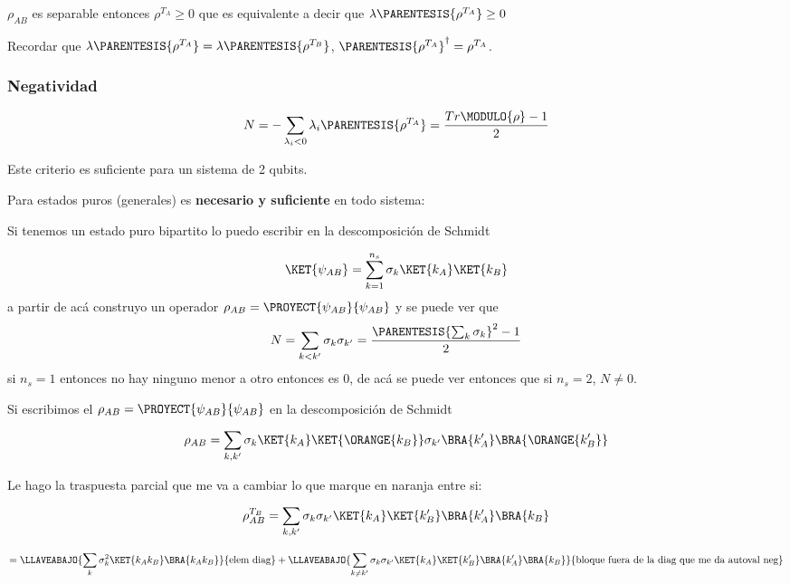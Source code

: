 $\rho_{AB}$ es separable entonces $\rho^{T_{A}}\ge0$ que es equivalente
a decir que $\lambda\PARENTESIS{\rho^{T_{A}}}\ge0$

Recordar que $\lambda\PARENTESIS{\rho^{T_{A}}}=\lambda\PARENTESIS{\rho^{T_{B}}}$,
$\PARENTESIS{\rho^{T_{A}}}^{\dagger}=\rho^{T_{A}}$.

\subsubsection{Negatividad}

\[
N=-\sum_{\lambda_{i}<0}\lambda_{i}\PARENTESIS{\rho^{T_{A}}}=\frac{Tr\MODULO{\rho}-1}{2}
\]

Este criterio es suficiente para un sistema de 2 qubits.

Para estados puros (generales) es \textbf{necesario y suficiente}
en todo sistema:

Si tenemos un estado puro bipartito lo puedo escribir en la descomposición
de Schmidt

\[
\KET{\psi_{AB}}=\sum_{k=1}^{n_{s}}\sigma_{k}\KET{k_{A}}\KET{k_{B}}
\]
 a partir de acá construyo un operador $\rho_{AB}=\PROYECT{\psi_{AB}}{\psi_{AB}}$
y se puede ver que 
\[
N=\sum_{k<k'}\sigma_{k}\sigma_{k'}=\frac{\PARENTESIS{\sum_{k}\sigma_{k}}^{2}-1}{2}
\]
 si $n_{s}=1$ entonces no hay ninguno menor a otro entonces es 0,
de acá se puede ver entonces que si $n_{s}=2$, $N\neq0$.

Si escribimos el $\rho_{AB}=\PROYECT{\psi_{AB}}{\psi_{AB}}$ en la
descomposición de Schmidt

\[
\rho_{AB}=\sum_{k,k'}\sigma_{k}\KET{k_{A}}\KET{\ORANGE{k_{B}}}\sigma_{k'}\BRA{k'_{A}}\BRA{\ORANGE{k'_{B}}}
\]

Le hago la traspuesta parcial que me va a cambiar lo que marque en
naranja entre si:

\[
\rho_{AB}^{T_{B}}=\sum_{k,k'}\sigma_{k}\sigma_{k'}\KET{k_{A}}\KET{k'_{B}}\BRA{k'_{A}}\BRA{k_{B}}
\]

\[
=\LLAVEABAJO{\sum_{k}\sigma_{k}^{2}\KET{k_{A}k_{B}}\BRA{k_{A}k_{B}}}{\text{elem diag}}+\LLAVEABAJO{\sum_{k\neq k'}\sigma_{k}\sigma_{k'}\KET{k_{A}}\KET{k'_{B}}\BRA{k'_{A}}\BRA{k_{B}}}{\text{bloque fuera de la diag que me da autoval neg}}
\]

